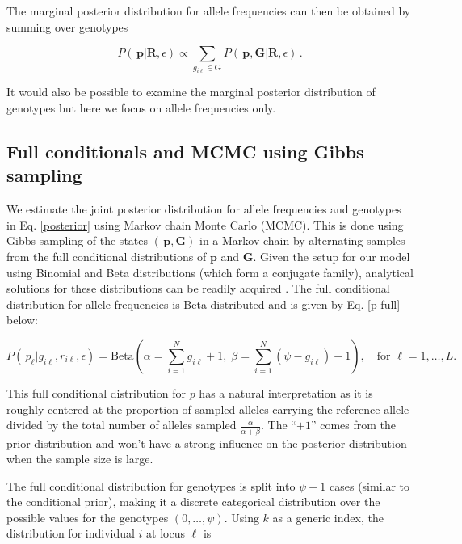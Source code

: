 \documentclass[11pt,english,letterpaper,oneside]{article}
\begin{document}
\noindent The marginal posterior distribution for allele frequencies can then be obtained by summing over genotypes

\begin{equation}\label{marg_post_p}
{P}(\,\bm{p}|\bm{R},\epsilon) \propto \displaystyle\sum_{g_{i \ell}\in\bm{G}} {P}(\,\bm{p},\bm{G}|\bm{R},\epsilon)\,.
\end{equation}

\noindent It would also be possible to examine the marginal posterior distribution of genotypes but here we focus on allele frequencies only.

\medskip
\subsection*{Full conditionals and MCMC using Gibbs sampling}
\medskip

\noindent We estimate the joint posterior distribution for allele frequencies and genotypes in Eq. \ref{posterior} using Markov chain Monte Carlo (MCMC). This is done using Gibbs sampling of the states $(\,\bm{p},\bm{G})$ in a Markov chain by alternating samples from the full conditional distributions of $\bm{p}$ and $\bm{G}$. Given the setup for our model using Binomial and Beta distributions (which form a conjugate family), analytical solutions for these distributions can be readily acquired \citep{gelman2014bayesian}. The full conditional distribution for allele frequencies is Beta distributed and is given by Eq. \ref{p-full} below:

\begin{equation}\label{p-full}
{P}(\,p_{\ell}|g_{i \ell},r_{i \ell},\epsilon) = \text{Beta}\left(\alpha= \sum_{i=1}^N g_{i \ell} +1,\; \beta = \sum_{i=1}^N (\psi-g_{i \ell})+1\right),\quad \text{for } \ell = 1,\ldots,L.
\end{equation}

\noindent This full conditional distribution for $p$ has a natural interpretation as it is roughly centered at the proportion of sampled alleles carrying the reference allele divided by the total number of alleles sampled $\frac{\alpha}{\alpha+\beta}$. The ``$+1$'' comes from the prior distribution and won't have a strong influence on the posterior distribution when the sample size is large.

The full conditional distribution for genotypes is split into $\psi+1$ cases (similar to the conditional prior), making it a discrete categorical distribution over the possible values for the genotypes $(0,\ldots,\psi)$. Using $k$ as a generic index, the distribution for individual $i$ at locus $\ell$ is
\end{document}
